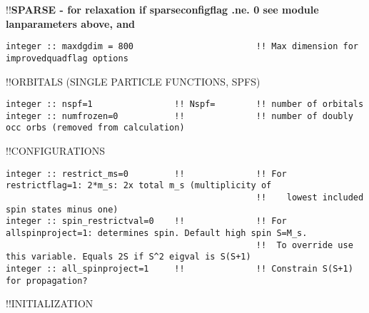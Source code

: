 !!\textbf{\qquad SPARSE - for relaxation if sparseconfigflag .ne. 0 see module lanparameters above, and}
\begin{verbatim}
integer :: maxdgdim = 800                        !! Max dimension for improvedquadflag options
\end{verbatim}
!!{\large \quad ORBITALS (SINGLE PARTICLE FUNCTIONS, SPFS)}
\begin{verbatim}
integer :: nspf=1                !! Nspf=        !! number of orbitals
integer :: numfrozen=0           !!              !! number of doubly occ orbs (removed from calculation)
\end{verbatim}
!!{\large \quad CONFIGURATIONS}
\begin{verbatim}
integer :: restrict_ms=0         !!              !! For restrictflag=1: 2*m_s: 2x total m_s (multiplicity of 
                                                 !!    lowest included spin states minus one)
integer :: spin_restrictval=0    !!              !! For allspinproject=1: determines spin. Default high spin S=M_s.
                                                 !!  To override use this variable. Equals 2S if S^2 eigval is S(S+1)
integer :: all_spinproject=1     !!              !! Constrain S(S+1) for propagation?
\end{verbatim}
!!{\large \quad INITIALIZATION}
